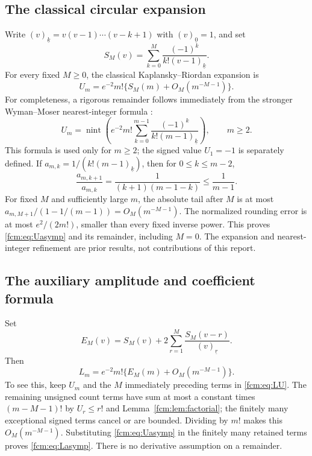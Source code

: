 \documentclass[11pt,letterpaper]{article}
\theoremstyle{remark}\newtheorem{remark}[theorem]{Remark}
\newcommand{\fall}[2]{(#1)_{\underline{#2}}}
\DeclareMathOperator{\nint}{nint}
\begin{document}
\subsection{The classical circular expansion}
Write $\fall{v}{k}=v(v-1)\cdots(v-k+1)$ with $\fall{v}{0}=1$, and set
\begin{equation}\label{fcm:eq:SM}
 S_M(v)=\sum_{k=0}^M\frac{(-1)^k}{k!\fall{v-1}{k}}.
\end{equation}
For every fixed $M\ge0$, the classical Kaplansky--Riordan expansion is
\begin{equation}\label{fcm:eq:Uasymp}
 U_m=e^{-2}m!\{S_M(m)+O_M(m^{-M-1})\}.
\end{equation}
For completeness, a rigorous remainder follows immediately from the stronger Wyman--Moser nearest-integer formula \cite[eq.~(3.23), p.~475]{wm}:
\begin{equation}\label{fcm:eq:round}
 U_m=\nint\left(e^{-2}m!\sum_{k=0}^{m-1}
       \frac{(-1)^k}{k!\fall{m-1}{k}}\right),\qquad m\ge2.
\end{equation}
This formula is used only for $m\ge2$; the signed value $U_1=-1$ is separately defined. If $a_{m,k}=1/(k!\fall{m-1}{k})$, then for $0\le k\le m-2$,
\[
 \frac{a_{m,k+1}}{a_{m,k}}=
 \frac1{(k+1)(m-1-k)}\le\frac1{m-1}.
\]
For fixed $M$ and sufficiently large $m$, the absolute tail after $M$ is at most $a_{m,M+1}/(1-1/(m-1))=O_M(m^{-M-1})$. The normalized rounding error is at most $e^2/(2m!)$, smaller than every fixed inverse power. This proves \eqref{fcm:eq:Uasymp} and its remainder, including $M=0$. The expansion and nearest-integer refinement are prior results, not contributions of this report.

\subsection{The auxiliary amplitude and coefficient formula}
Set
\begin{equation}\label{fcm:eq:EM}
 E_M(v)=S_M(v)+2\sum_{r=1}^{M}\frac{S_M(v-r)}{\fall vr}.
\end{equation}
Then
\begin{equation}\label{fcm:eq:Lasymp}
 L_m=e^{-2}m!\{E_M(m)+O_M(m^{-M-1})\}.
\end{equation}
To see this, keep $U_m$ and the $M$ immediately preceding terms in \eqref{fcm:eq:LU}. The remaining unsigned count terms have sum at most a constant times $(m-M-1)!$ by $U_r\le r!$ and Lemma~\ref{fcm:lem:factorial}; the finitely many exceptional signed terms cancel or are bounded. Dividing by $m!$ makes this $O_M(m^{-M-1})$. Substituting \eqref{fcm:eq:Uasymp} in the finitely many retained terms proves \eqref{fcm:eq:Lasymp}. There is no derivative assumption on a remainder.
\end{document}
